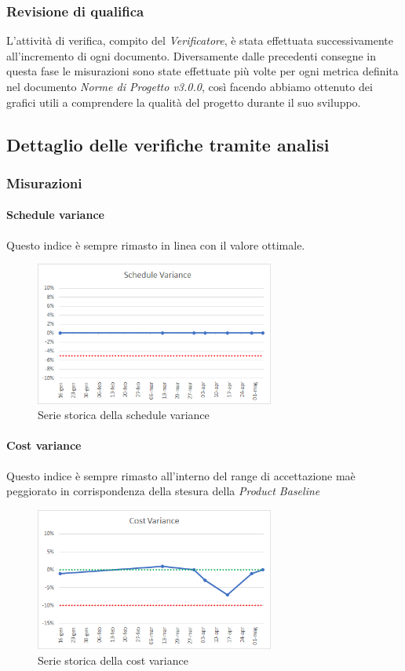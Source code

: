 	\subsubsection{Revisione di qualifica}
	L'attività di verifica, compito  del \emph{Verificatore}, è stata effettuata successivamente all'incremento di ogni documento.
	Diversamente dalle precedenti consegne in questa fase le misurazioni sono state effettuate più volte per ogni metrica definita nel documento \emph{Norme di Progetto v3.0.0}, così facendo abbiamo ottenuto dei grafici utili a comprendere la qualità del progetto durante il suo sviluppo.
	
	\subsection{Dettaglio delle verifiche tramite analisi}
	\label{AdR_Dettaglio}
	\subsubsection{Misurazioni}
	\label{misure}
	\paragraph{Schedule variance} \Spazio
	Questo indice è sempre rimasto in linea con il valore ottimale.
	\begin{figure}[H]
		\centering 
		\includegraphics[width=0.7\textwidth]{Images/SV.png}
		\caption{Serie storica della schedule variance}
		\label{SV} 
	\end{figure}
    \paragraph{Cost variance} \Spazio
    Questo indice è sempre rimasto all'interno del range di accettazione maè peggiorato in corrispondenza della stesura della \emph{Product Baseline}
    \begin{figure}[H]
	\centering 
	\includegraphics[width=0.7\textwidth]{Images/CV.png}
	\caption{Serie storica della cost variance}
	\label{CV} 
    \end{figure}
	
